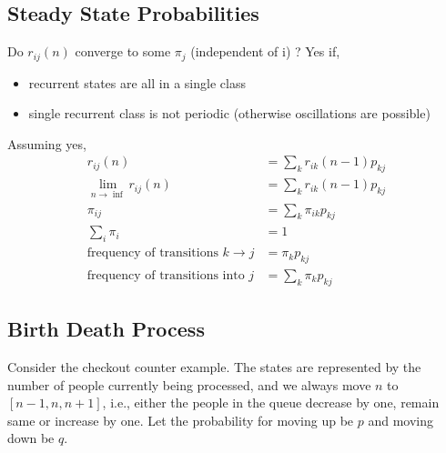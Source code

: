 \documentclass[11pt, a4paper]{article}
\begin{document}
    \subsection{Steady State Probabilities}
    \label{sec_markov_steady}
    Do $r_{ij}(n)$ converge to some $\pi_{j}$ (independent of i) ? \newline
    Yes if,
    \begin{itemize}
        \item recurrent states are all in a single class
        \item single recurrent class is not periodic (otherwise oscillations are possible)
    \end{itemize}
    Assuming yes,
    \begin{align*}
        r_{ij}(n) &= \sum_{k} r_{ik}(n-1)p_{kj}\\
        \lim_{n \to \inf} r_{ij}(n) &= \sum_{k} r_{ik}(n-1)p_{kj}\\
        \pi_{ij} &= \sum_{k} \pi_{ik} p_{kj} \tag*{balance equations} \\
        \sum_{i} \pi_{i} &= 1 \\
        \text{frequency of transitions $k \rightarrow j$} &= \pi_{k} p_{kj} \tag*{in one step}\\
        \text{frequency of transitions into $j$} &= \sum_{k} \pi_{k} p_{kj} \tag*{influx from all connected states}
    \end{align*}

    \subsection{Birth Death Process}
    Consider the checkout counter example. The states are represented by the number of people currently being processed, and we always move $n$ to $[n-1, n, n+1]$, i.e., either the people in the queue decrease by one, remain same or increase by one. Let the probability for moving up be $p$ and moving down be $q$.
\end{document}
